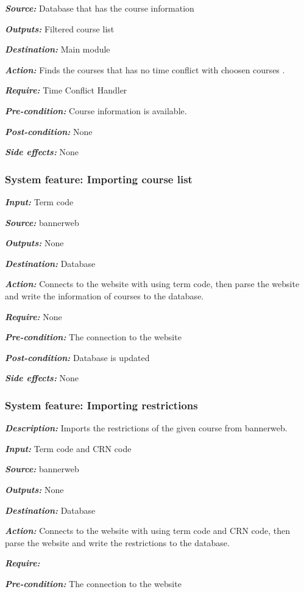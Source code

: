 \documentclass[twoside,letterpaper]{article}
\newcommand{\featuresection}[1] {
\subsubsection[System feature: #1]{\selectlanguage{english}\rmfamily\bfseries\color{black} System feature: #1}
}
\begin{document}
{\emph{\textbf{Source:}} Database that has the course information

\emph{\textbf{Outputs:}} Filtered course list

\emph{\textbf{Destination:}} Main module

\emph{\textbf{Action:}} Finds the courses that has no time conflict with choosen courses .

\emph{\textbf{Require:}} Time Conflict Handler

\emph{\textbf{Pre-condition: }} Course information is available.

\emph{\textbf{Post-condition: }} None

\emph{\textbf{Side effects:}} None



\featuresection{Importing course list}

\emph{\textbf{Input:}}  Term code

\emph{\textbf{Source:}} bannerweb

\emph{\textbf{Outputs:}} None

\emph{\textbf{Destination:}} Database

\emph{\textbf{Action:}} Connects to the website with using term code, then parse the website and write the information of courses to the database.  

\emph{\textbf{Require:}} None

\emph{\textbf{Pre-condition: }} The connection to the website

\emph{\textbf{Post-condition: }} Database is updated

\emph{\textbf{Side effects:}} None



\featuresection{Importing restrictions}

\emph{\textbf{Description:}} Imports the restrictions of the given course from bannerweb.

\emph{\textbf{Input:}}  Term code and CRN code

\emph{\textbf{Source:}} bannerweb

\emph{\textbf{Outputs:}} None

\emph{\textbf{Destination:}} Database

\emph{\textbf{Action:}} Connects to the website with using term code and CRN code, then parse the website and write the restrictions to the database.  

\emph{\textbf{Require:}}

\emph{\textbf{Pre-condition: }} The connection to the website

}
\end{document}
